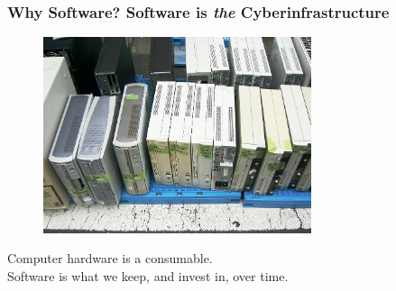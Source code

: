 \begin{frame}
\frametitle{Why Software? Software is {\em the} Cyberinfrastructure}

\begin{figure}[htbp]
\begin{center}
\includegraphics[width=0.7\textwidth]{images/Junk_desktop_personal_computer.jpg}
\end{center}
\end{figure}

\begin{center}
\small{Computer hardware is a consumable. \\ Software is what we keep, and invest in, over time.}
\end{center}

\end{frame}



